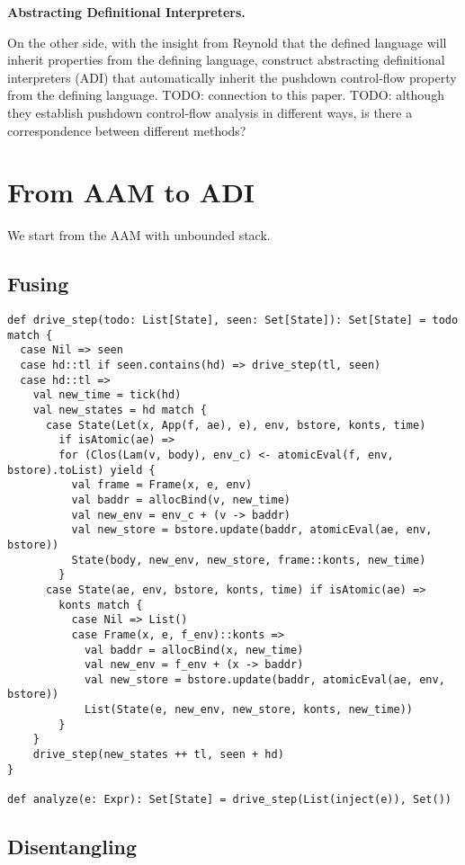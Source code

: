 \documentclass[acmsmall,review,anonymous]{acmart}\settopmatter{printfolios=true,printccs=false,printacmref=false}
\begin{document}
\textbf{Abstracting Definitional Interpreters.}

On the other side, with the insight from Reynold that the defined language will inherit properties
from the defining language, \citeauthor{darais2017abstracting} construct abstracting 
definitional interpreters (ADI) that automatically inherit the pushdown control-flow 
property from the defining language.
TODO: connection to this paper.
TODO: although they establish pushdown control-flow analysis in different ways, 
is there a correspondence between different methods?

\section{From AAM to ADI}

We start from the AAM with unbounded stack.

\subsection{Fusing}

\begin{verbatim}
def drive_step(todo: List[State], seen: Set[State]): Set[State] = todo match {
  case Nil => seen
  case hd::tl if seen.contains(hd) => drive_step(tl, seen)
  case hd::tl =>
    val new_time = tick(hd)
    val new_states = hd match {
      case State(Let(x, App(f, ae), e), env, bstore, konts, time) 
        if isAtomic(ae) =>
        for (Clos(Lam(v, body), env_c) <- atomicEval(f, env, bstore).toList) yield {
          val frame = Frame(x, e, env)
          val baddr = allocBind(v, new_time)
          val new_env = env_c + (v -> baddr)
          val new_store = bstore.update(baddr, atomicEval(ae, env, bstore))
          State(body, new_env, new_store, frame::konts, new_time)
        }
      case State(ae, env, bstore, konts, time) if isAtomic(ae) =>
        konts match {
          case Nil => List()
          case Frame(x, e, f_env)::konts =>
            val baddr = allocBind(x, new_time)
            val new_env = f_env + (x -> baddr)
            val new_store = bstore.update(baddr, atomicEval(ae, env, bstore))
            List(State(e, new_env, new_store, konts, new_time))
        }
    }
    drive_step(new_states ++ tl, seen + hd)
}

def analyze(e: Expr): Set[State] = drive_step(List(inject(e)), Set())
\end{verbatim}

\subsection{Disentangling}
\end{document}
